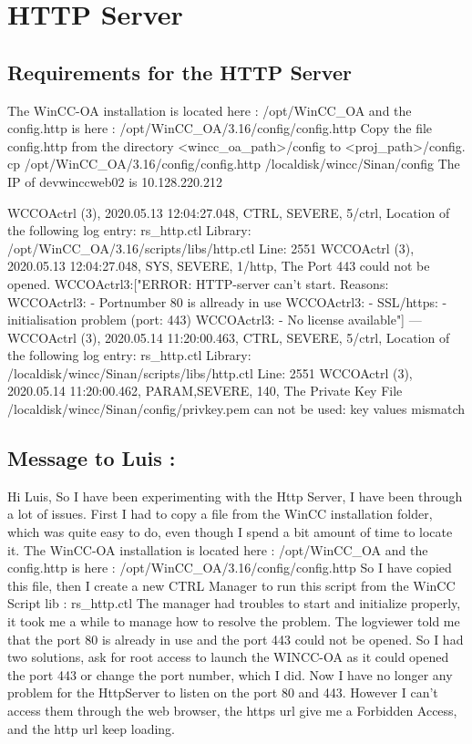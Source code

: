 \documentclass[a4paper, 10pt]{article}
\begin{document}
\newpage
\section{HTTP Server}
\subsection{Requirements for the HTTP Server}
The WinCC-OA installation is located here : /opt/WinCC\_OA and the config.http is here : /opt/WinCC\_OA/3.16/config/config.http
Copy the file config.http from the directory <wincc\_oa\_path>/config to <proj\_path>/config.
cp /opt/WinCC\_OA/3.16/config/config.http /localdisk/wincc/Sinan/config
The IP of devwinccweb02 is 10.128.220.212


WCCOActrl    (3), 2020.05.13 12:04:27.048, CTRL, SEVERE,      5/ctrl, Location of the following log entry: rs\_http.ctl    Library: /opt/WinCC\_OA/3.16/scripts/libs/http.ctl
Line: 2551
WCCOActrl    (3), 2020.05.13 12:04:27.048, SYS,  SEVERE,      1/http, The Port 443 could not be opened.
WCCOActrl3:["ERROR: HTTP-server can't start. Reasons:
WCCOActrl3: - Portnumber 80 is allready in use
WCCOActrl3: - SSL/https: - initialisation problem (port: 443)
WCCOActrl3: - No license available"]
---
WCCOActrl    (3), 2020.05.14 11:20:00.463, CTRL, SEVERE,      5/ctrl, Location of the following log entry: rs\_http.ctl    Library: /localdisk/wincc/Sinan/scripts/libs/http.ctl
    Line: 2551
WCCOActrl    (3), 2020.05.14 11:20:00.462, PARAM,SEVERE,    140, The Private Key File /localdisk/wincc/Sinan/config/privkey.pem can not be used: key values mismatch

\subsection*{Message to Luis :}

Hi Luis,
So I have been experimenting with the Http Server, I have been through a lot of issues.
First I had to copy a file from the WinCC installation folder, which was quite easy to do, even though I spend a bit amount of time to locate it.
The WinCC-OA installation is located here : /opt/WinCC\_OA and the config.http is here : /opt/WinCC\_OA/3.16/config/config.http
So I have copied this file, then I create a new CTRL Manager to run this script from the WinCC Script lib : rs\_http.ctl
The manager had troubles to start and initialize properly, it took me a while to manage how to resolve the problem.
The logviewer told me that the port 80 is already in use and the port 443 could not be opened.
So I had two solutions, ask for root access to launch the WINCC-OA as it could opened the port 443 or change the port number, which I did.
Now I have no longer any problem for the HttpServer to listen on the port 80 and 443.
However I can't access them through the web browser, the https url give me a Forbidden Access, and the http url keep loading.
\end{document}
